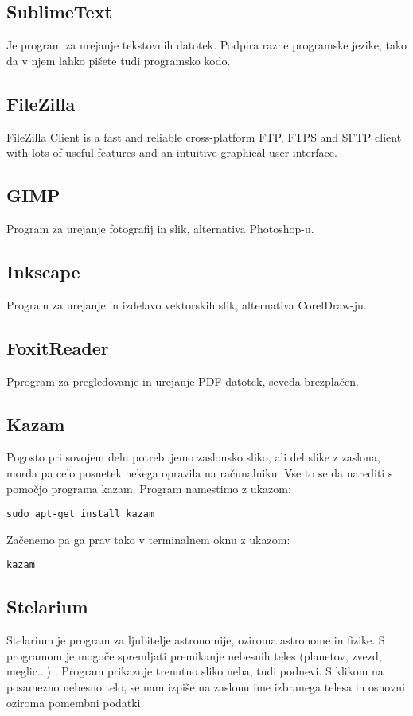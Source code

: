 \documentclass[12pt,a4paper,twoside]{article}
\begin{document}
\subsection{SublimeText}
Je program za urejanje tekstovnih datotek. Podpira razne programske jezike, tako da v njem lahko pišete tudi programsko kodo. 

\subsection{FileZilla}
FileZilla Client is a fast and reliable cross-platform FTP, FTPS and SFTP client with lots of useful features and an intuitive graphical user interface.

\subsection{GIMP}
Program za urejanje fotografij in slik, alternativa Photoshop-u. 

\subsection{Inkscape}
Program za urejanje in izdelavo vektorskih slik, alternativa CorelDraw-ju. 


\subsection{FoxitReader}
Pprogram za pregledovanje in urejanje PDF datotek, seveda brezplačen. 

\subsection{Kazam}
Pogosto pri sovojem delu potrebujemo zaslonsko sliko, ali del slike z zaslona, morda pa celo posnetek nekega opravila na računalniku. Vse to se da narediti s pomočjo programa kazam. 
Program namestimo z ukazom:

\texttt{sudo apt-get install kazam}

Začenemo pa ga prav tako v terminalnem oknu z ukazom:

\texttt{kazam}

\subsection{Stelarium}
Stelarium je program za ljubitelje astronomije, oziroma astronome in fizike. S programom je mogoče spremljati premikanje nebesnih teles (planetov, zvezd, meglic...) . Program prikazuje trenutno sliko neba, tudi podnevi. S klikom na posamezno nebesno telo, se nam izpiše na zaslonu ime izbranega telesa in osnovni  oziroma pomembni podatki. 
\end{document}
